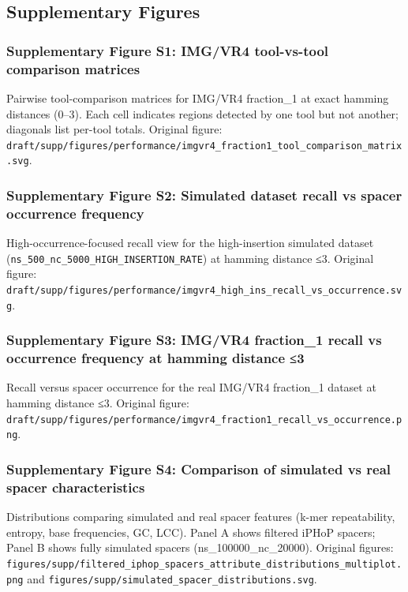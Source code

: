 \documentclass[
]{article}
\begin{document}
\subsection{Supplementary Figures}\label{supplementary-figures}

\subsubsection{Supplementary Figure S1: IMG/VR4 tool-vs-tool comparison
matrices}\label{fig-supp-real-matrix}

Pairwise tool-comparison matrices for IMG/VR4 fraction\_1 at exact
hamming distances (0--3). Each cell indicates regions detected by one
tool but not another; diagonals list per-tool totals. Original figure:
\texttt{draft/supp/figures/performance/imgvr4\_fraction1\_tool\_comparison\_matrix.svg}.

\subsubsection{Supplementary Figure S2: Simulated dataset recall vs
spacer occurrence frequency}\label{fig-supp-sim-recall}

High-occurrence-focused recall view for the high-insertion simulated
dataset (\texttt{ns\_500\_nc\_5000\_HIGH\_INSERTION\_RATE}) at hamming
distance ≤3. Original figure:
\texttt{draft/supp/figures/performance/imgvr4\_high\_ins\_recall\_vs\_occurrence.svg}.

\subsubsection{Supplementary Figure S3: IMG/VR4 fraction\_1 recall vs
occurrence frequency at hamming distance ≤3}\label{fig-supp-real-recall}

Recall versus spacer occurrence for the real IMG/VR4 fraction\_1 dataset
at hamming distance ≤3. Original figure:
\texttt{draft/supp/figures/performance/imgvr4\_fraction1\_recall\_vs\_occurrence.png}.

\subsubsection{Supplementary Figure S4: Comparison of simulated vs real
spacer characteristics}\label{fig-supp-spacer-comparison}

Distributions comparing simulated and real spacer features (k-mer
repeatability, entropy, base frequencies, GC, LCC). Panel A shows
filtered iPHoP spacers; Panel B shows fully simulated spacers
(ns\_100000\_nc\_20000). Original figures:
\texttt{figures/supp/filtered\_iphop\_spacers\_attribute\_distributions\_multiplot.png}
and \texttt{figures/supp/simulated\_spacer\_distributions.svg}.
\end{document}
